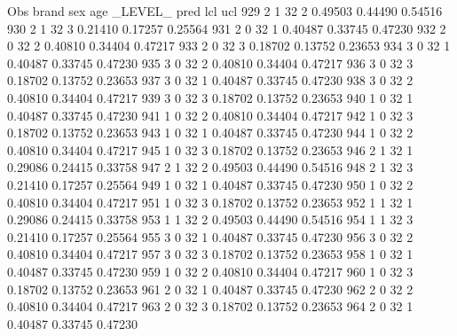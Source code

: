 \documentclass{article}
\begin{document}
\begin{Woutput}
 Obs    brand    sex    age    _LEVEL_      pred       lcl        ucl
 929      2       1      32       2       0.49503    0.44490    0.54516
 930      2       1      32       3       0.21410    0.17257    0.25564
 931      2       0      32       1       0.40487    0.33745    0.47230
 932      2       0      32       2       0.40810    0.34404    0.47217
 933      2       0      32       3       0.18702    0.13752    0.23653
 934      3       0      32       1       0.40487    0.33745    0.47230
 935      3       0      32       2       0.40810    0.34404    0.47217
 936      3       0      32       3       0.18702    0.13752    0.23653
 937      3       0      32       1       0.40487    0.33745    0.47230
 938      3       0      32       2       0.40810    0.34404    0.47217
 939      3       0      32       3       0.18702    0.13752    0.23653
 940      1       0      32       1       0.40487    0.33745    0.47230
 941      1       0      32       2       0.40810    0.34404    0.47217
 942      1       0      32       3       0.18702    0.13752    0.23653
 943      1       0      32       1       0.40487    0.33745    0.47230
 944      1       0      32       2       0.40810    0.34404    0.47217
 945      1       0      32       3       0.18702    0.13752    0.23653
 946      2       1      32       1       0.29086    0.24415    0.33758
 947      2       1      32       2       0.49503    0.44490    0.54516
 948      2       1      32       3       0.21410    0.17257    0.25564
 949      1       0      32       1       0.40487    0.33745    0.47230
 950      1       0      32       2       0.40810    0.34404    0.47217
 951      1       0      32       3       0.18702    0.13752    0.23653
 952      1       1      32       1       0.29086    0.24415    0.33758
 953      1       1      32       2       0.49503    0.44490    0.54516
 954      1       1      32       3       0.21410    0.17257    0.25564
 955      3       0      32       1       0.40487    0.33745    0.47230
 956      3       0      32       2       0.40810    0.34404    0.47217
 957      3       0      32       3       0.18702    0.13752    0.23653
 958      1       0      32       1       0.40487    0.33745    0.47230
 959      1       0      32       2       0.40810    0.34404    0.47217
 960      1       0      32       3       0.18702    0.13752    0.23653
 961      2       0      32       1       0.40487    0.33745    0.47230
 962      2       0      32       2       0.40810    0.34404    0.47217
 963      2       0      32       3       0.18702    0.13752    0.23653
 964      2       0      32       1       0.40487    0.33745    0.47230

\end{Woutput}
\end{document}
